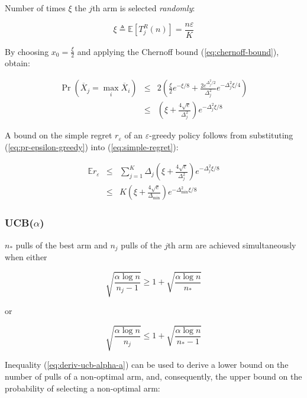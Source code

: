 \documentclass{article}
\newcommand {\IE} {\ensuremath {\mathbb{E}}}
\begin{document}
Number of times $\xi$ the $j$th arm is selected {\it randomly}:

\begin{equation}
\xi\triangleq\IE\left[T_j^R(n)\right]=\frac {n\varepsilon} K
\end{equation}

By choosing $x_0=\frac \xi 2$ and applying the Chernoff bound (\ref{eq:chernoff-bound}), obtain:

\begin{eqnarray}
\label{eq:pr-epsilon-greedy}
\Pr(\overline X_j=\max_i\overline X_i)&\le& 2\left(\frac {\xi}{2} e^{-\xi/8} + \frac {2e^{\Delta_j^2/2}}{\Delta_j^2}e^{-\Delta_j^2 \xi/4}\right)\nonumber\\
&\le&\left(\xi + \frac {4\sqrt e}{\Delta_j^2}\right)e^{-\Delta_j^2\xi/8}
\end{eqnarray}

A bound on the simple regret $r_\varepsilon$ of an
$\varepsilon$-greedy policy follows from substituting
(\ref{eq:pr-epsilon-greedy}) into (\ref{eq:simple-regret}):

\begin{eqnarray}
  \IE r_\varepsilon&\le&\sum_{j=1}^K\Delta_j\left(\xi + \frac {4\sqrt e}
{\Delta_j^2}\right)e^{-\Delta_j^2\xi/8}\nonumber\\
&\le&K\left(\xi + \frac {4\sqrt
    e}{\Delta_{\min}}\right)e^{-\Delta_{\min}^2\xi/8}
\label{eq:deriv-epsilon-greedy-b}
\end{eqnarray}

\subsubsection{UCB($\alpha$)}
\label{app:derivations-finite-ucb}

$n_*$ pulls of the best arm and $n_j$ pulls of the $j$th arm are
achieved simultaneously when either 


\begin{equation}
\sqrt {\frac {\alpha \log n} {n_j-1}} \ge 1 + \sqrt { \frac {\alpha \log n} {n_*}}
\end{equation}

or

\begin{equation}
\sqrt {\frac {\alpha \log n} {n_j}} \le 1 + \sqrt { \frac {\alpha \log n} {n_* - 1}}
\label{eq:deriv-ucb-alpha-a}
\end{equation}

Inequality (\ref{eq:deriv-ucb-alpha-a}) can be used to derive a lower
bound on the number of pulls of a non-optimal arm,  and, consequently, the upper
bound on the probability of selecting a non-optimal arm:
\end{document}
